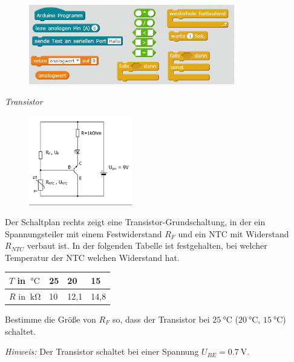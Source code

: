 \begin{aufgabe}
	\begin{figure}[H]
		\centering
		\includegraphics[width=0.8\textwidth]{./pics/befehle-fuer-ldr-in-reihe.png}
	\end{figure}
\end{aufgabe}

\newpage
\begin{aufgabe} \emph{Transistor}
	
	\begin{figure}
		\centering
		\vspace{-\baselineskip}
		\includegraphics[width=0.4\textwidth]{./Zeichnungen/schaltplan-transistor-und-ntc.png}
	\end{figure}
	Der Schaltplan rechts zeigt eine Transistor-Grundschaltung, in der ein Spannungsteiler mit einem Festwiderstand $R_F$ und ein NTC mit Widerstand $R_{NTC}$ verbaut ist. In der folgenden Tabelle ist festgehalten, bei welcher Temperatur der NTC welchen Widerstand hat.
	
	\medskip
	\begin{tabular}{l|l|l|l}
		$T$ in $\SI{}{\celsius}$ & 25 & 20 & 15 \\ \hline
		$R$ in $\SI{}{\kilo\ohm}$ & 10 & 12,1 & 14,8 \\
	\end{tabular}
	
	\medskip
	Bestimme die Größe von $R_F$ so, dass der Transistor bei $\SI{25}{\celsius}$ ($\SI{20}{\celsius}$, $\SI{15}{\celsius}$) schaltet.
	
	\emph{Hinweis:} Der Transistor schaltet bei einer Spannung $U_{BE} = \SI{0,7}{\volt}$.
\end{aufgabe}

